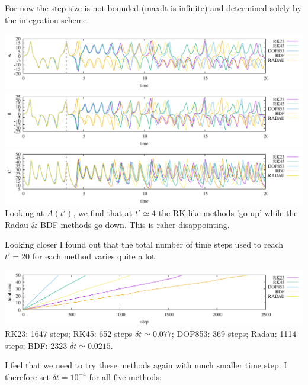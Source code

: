 For now the step size is not bounded ({\python maxdt} is infinite)
and determined solely by the integration scheme.

\begin{center}
\includegraphics[width=16cm]{python_codes/fieldstone_156/blog/A_auto.pdf}\\
\includegraphics[width=16cm]{python_codes/fieldstone_156/blog/B_auto.pdf}\\
\includegraphics[width=16cm]{python_codes/fieldstone_156/blog/C_auto.pdf}\\
{\captionfont Looking at $A(t')$, we find that at $t'\simeq 4$ the RK-like
methods 'go up' while the Radau \& BDF methods go down. This is raher 
disappointing.}
\end{center}

Looking closer I found out that the total number of time steps used to reach $t'=20$
for each method varies quite a lot:
\begin{center}
\includegraphics[width=16cm]{python_codes/fieldstone_156/blog/time_auto.pdf}\\
{\captionfont RK23: 1647 steps; RK45: 652 steps $\delta t \simeq 0.077$; DOP853: 369 steps;
Radau: 1114 steps; BDF: 2323 $\delta t \simeq 0.0215$.}  
\end{center}

I feel that we need to try these methods again with much smaller time step.
I therefore set $\delta t=10^{-4}$ for all five methods:


